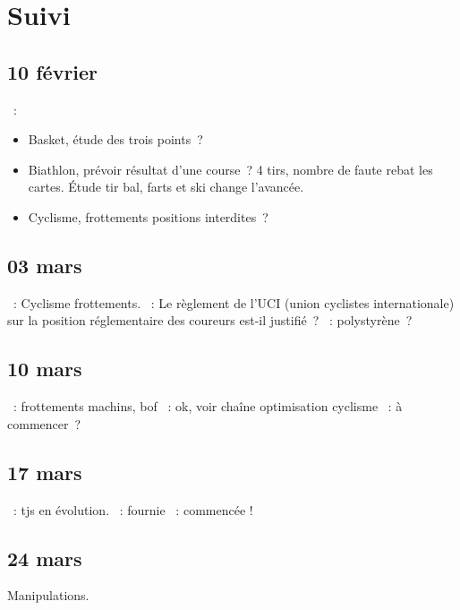 \documentclass[a4paper, 11pt, final, garamond]{book}
\begin{document}
\section{Suivi}
\subsection{10 février}
\begin{itemize}
  ~:
    \begin{itemize}
      \item Basket, étude des trois points~?
      \item Biathlon, prévoir résultat d'une course~? 4 tirs, nombre de
          faute rebat les cartes. Étude tir bal, farts et ski change
          l'avancée.
      \item Cyclisme, frottements positions interdites~?
    \end{itemize}
\end{itemize}

\subsection{03 mars}
\begin{itemize}
    ~: Cyclisme frottements.
    ~: Le règlement de l'UCI (union cyclistes internationale) sur
        la position réglementaire des coureurs est-il justifié~? 
    ~: polystyrène~?
\end{itemize}

\subsection{10 mars}
\begin{itemize}
    ~: frottements machins, bof
    ~: ok, voir chaîne optimisation cyclisme
    ~: à commencer~?
\end{itemize}

\subsection{17 mars}
\begin{itemize}
    ~: tjs en évolution.
    ~: fournie
    ~: commencée !
\end{itemize}

\subsection{24 mars}
\begin{center}
    Manipulations.
\end{center}
\end{document}
